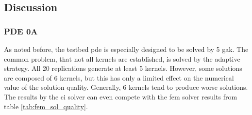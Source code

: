 \documentclass[./\jobname.tex]{subfiles}
\begin{document}
\subsection{Discussion}
\subsubsection{PDE 0A}
\label{chap:ex2_discussion_pde0a}
As noted before, the testbed \gls{pde} is especially designed to be solved by 5 \gls{gak}. The common problem, that not all kernels are established, is solved by the adaptive strategy. All 20 replications generate at least 5 kernels. However, some solutions are composed of 6 kernels, but this has only a limited effect on the numerical value of the solution quality. Generally, 6 kernels tend to produce worse solutions. The results by the \gls{ci} solver can even compete with the \gls{fem} solver results from table \ref{tab:fem_sol_quality}.
\end{document}
